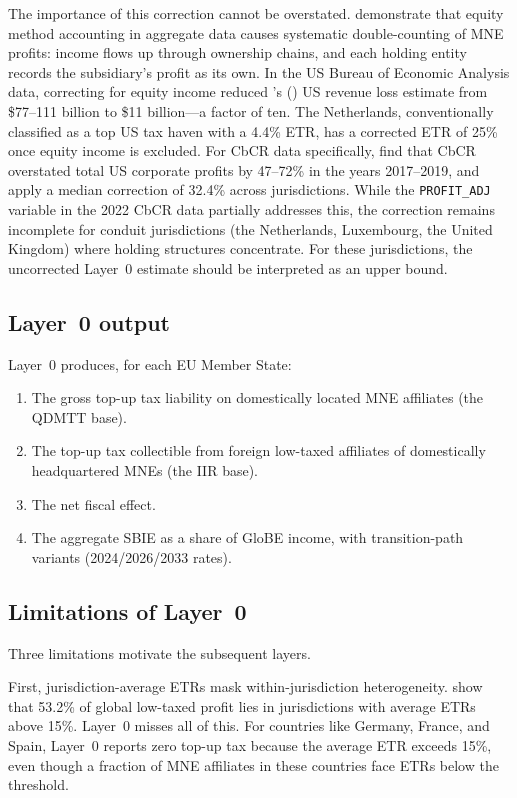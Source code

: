\documentclass[11pt,a4paper]{article}
\newcommand{\code}[1]{\texttt{#1}}
\begin{document}
The importance of this correction cannot be overstated. \citet{blouin2023} demonstrate that equity method accounting in aggregate data causes systematic double-counting of MNE profits: income flows up through ownership chains, and each holding entity records the subsidiary's profit as its own. In the US Bureau of Economic Analysis data, correcting for equity income reduced \citeauthor{clausing2016}'s (\citeyear{clausing2016}) US revenue loss estimate from \$77--111 billion to \$11 billion---a factor of ten. The Netherlands, conventionally classified as a top US tax haven with a 4.4\% ETR, has a corrected ETR of 25\% once equity income is excluded. For CbCR data specifically, \citet{garcia2022} find that CbCR overstated total US corporate profits by 47--72\% in the years 2017--2019, and \citet{hugger2025} apply a median correction of 32.4\% across jurisdictions. While the \code{PROFIT\_ADJ} variable in the 2022 CbCR data partially addresses this, the correction remains incomplete for conduit jurisdictions (the Netherlands, Luxembourg, the United Kingdom) where holding structures concentrate. For these jurisdictions, the uncorrected Layer~0 estimate should be interpreted as an upper bound.

\subsection{Layer~0 output}\label{sec:layer0_output}

Layer~0 produces, for each EU Member State:
\begin{enumerate}
\item The gross top-up tax liability on domestically located MNE affiliates (the QDMTT base).
\item The top-up tax collectible from foreign low-taxed affiliates of domestically headquartered MNEs (the IIR base).
\item The net fiscal effect.
\item The aggregate SBIE as a share of GloBE income, with transition-path variants (2024/2026/2033 rates).
\end{enumerate}

\subsection{Limitations of Layer~0}\label{sec:layer0_limits}

Three limitations motivate the subsequent layers.

First, jurisdiction-average ETRs mask within-jurisdiction heterogeneity. \citet{hugger2025} show that 53.2\% of global low-taxed profit lies in jurisdictions with average ETRs above 15\%. Layer~0 misses all of this. For countries like Germany, France, and Spain, Layer~0 reports zero top-up tax because the average ETR exceeds 15\%, even though a fraction of MNE affiliates in these countries face ETRs below the threshold.
\end{document}

